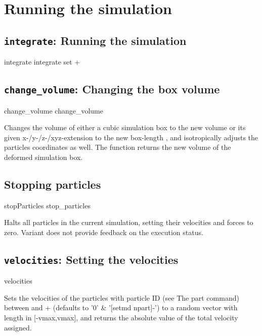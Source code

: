 \chapter{Running the simulation}
\label{chap:run}

\section{\texttt{integrate}: Running the simulation}

\begin{essyntax}
   integrate 
   integrate set  +
\end{essyntax}


\section{\texttt{change_volume}: Changing the box volume}

\begin{essyntax}
   change_volume  
   change_volume  
\end{essyntax}
Changes the volume of either a cubic simulation box to the new volume
 or its given x-/y-/z-/xyz-extension to the new box-length
, and isotropically adjusts the particles coordinates as
well. The function returns the new volume of the deformed simulation
box.

\section{Stopping particles}

\begin{essyntax}
   stopParticles
   stop_particles
\end{essyntax}
Halts all particles in the current simulation, setting their
velocities and forces to zero. Variant  does not provide
feedback on the execution status.

\section{\texttt{velocities}: Setting the velocities}
\begin{essyntax}
  velocities  
\end{essyntax}
Sets the velocities of the particles with particle ID (see The part
command) between  and +
(defaults to '0' \& '[setmd npart]-') to a random vector
with length in [-vmax,vmax], and returns the absolute value of the
total velocity assigned.

